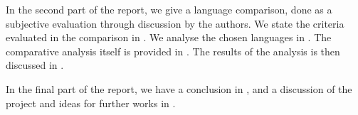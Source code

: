 In the second part of the report, we give a language comparison, done as a subjective evaluation through discussion by the authors. We state the criteria evaluated in the comparison in . We analyse the chosen languages in . The comparative analysis itself is provided in . The results of the analysis is then discussed in .

In the final part of the report, we have a conclusion in , and a discussion of the project and ideas for further works in .





